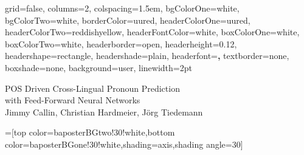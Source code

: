 \documentclass[dvipsnames,a0paper,portrait]{baposter}
\begin{document}
\newlength{\leftimgwidth}
\begin{poster}%
  {
  grid=false,
  columns=2,
  colspacing=1.5em,
  bgColorOne=white,
  bgColorTwo=white,
  borderColor=uured,
  headerColorOne=uured,
  headerColorTwo=reddishyellow,
  headerFontColor=white,
  boxColorOne=white,
  boxColorTwo=white,
  headerborder=open,
  headerheight=0.12\textheight,
  headershape=rectangle,
  headershade=plain,
  headerfont=\Large\textbf,
  textborder=none,
  boxshade=none,
  background=user,
  linewidth=2pt
  }
  {}
  {
  \hspace*{.17\textwidth}%
  \parbox{.83\textwidth}{%
    \normalfont
    {\sffamily POS Driven Cross-Lingual Pronoun Prediction \\ with Feed-Forward Neural Networks\\
    {\Large Jimmy Callin, Christian Hardmeier, Jörg Tiedemann}}}}
  {}
  {
  }

  =[top color=baposterBGtwo!30!white,bottom color=baposterBGone!30!white,shading=axis,shading angle=30]

     \setlength{\leftimgwidth}{0.78em+8.0em}

    \newcommand{\colouredcircle}[1]{%
      \tikz{\useasboundingbox (-0.2em,-0.32em) rectangle(0.2em,0.32em); \draw[draw=black,fill=baposterBGone!80!black!#1!white,line width=0.03em] (0,0) circle(0.18em);}}




\end{poster}
\end{document}
